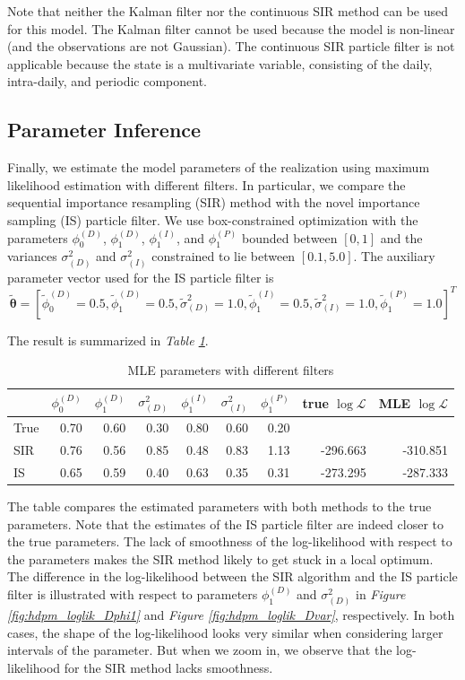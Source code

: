 \documentclass[11pt, oneside]{scrreprt}   	%
\begin{document}
Note that neither the Kalman filter nor the continuous SIR method can be used for this model. The Kalman filter cannot be used because the model is non-linear (and the observations are not Gaussian). The continuous SIR particle filter is not applicable because the state is a multivariate variable, consisting of the daily, intra-daily, and periodic component.\\

\subsection{Parameter Inference}
Finally, we estimate the model parameters of the realization using maximum likelihood estimation with different filters. In particular, we compare the sequential importance resampling (SIR) method with the novel importance sampling (IS) particle filter. We use box-constrained optimization with the parameters $\phi_0^{(D)}$,  $\phi_1^{(D)}$, $\phi_1^{(I)}$, and $\phi_1^{(P)}$ bounded between $[0,1]$ and the variances $\sigma^2_{(D)}$ and $\sigma^2_{(I)}$ constrained to lie between $[0.1, 5.0]$. The auxiliary parameter vector used for the IS particle filter is 
$$
\boldsymbol{\tilde{\theta}} = [ \tilde{\phi}_0^{(D)} = 0.5,  \tilde{\phi}_1^{(D)} = 0.5, \tilde{\sigma}^2_{(D)} = 1.0, \tilde{\phi}_1^{(I)} = 0.5, \tilde{\sigma}^2_{(I)} = 1.0, \tilde{\phi}_1^{(P)} = 1.0]^T
$$


The result is summarized in \textit{Table \ref{tab:hdpm_param_inference}}.\\  

\begin{table}[h!]
\centering
\begin{tabular}{l r r r r r r r r}
\hline
& $\phi_0^{(D)}$ &  $\phi_1^{(D)}$ & $\sigma^2_{(D)}$ & $\phi_1^{(I)}$ & $\sigma^2_{(I)}$ & $\phi_1^{(P)}$ & true $\log \mathcal{L} $ & MLE $\log \mathcal{L} $ \\
\hline
True        & 0.70  & 0.60 &  0.30 & 0.80 & 0.60 & 0.20&  &  \\
SIR         & 0.76  & 0.56  & 0.85 & 0.48 & 0.83 & 1.13 & -296.663 & -310.851 \\
IS            & 0.65  & 0.59  & 0.40 & 0.63 & 0.35 & 0.31 & -273.295 & -287.333\\
\hline
\end{tabular}
\caption{MLE parameters with different filters}
\label{tab:hdpm_param_inference}
\end{table}
The table compares the estimated parameters with both methods to the true parameters. Note that the estimates of the IS particle filter are indeed closer to the true parameters. The lack of smoothness of the log-likelihood with respect to the parameters makes the SIR method likely to get stuck in a local optimum. The difference in the log-likelihood between the SIR algorithm and the IS particle filter is illustrated with respect to parameters $\phi_1^{(D)}$ and $\sigma_{(D)}^2$ in \textit{Figure \ref{fig:hdpm_loglik_Dphi1}} and \textit{Figure \ref{fig:hdpm_loglik_Dvar}}, respectively. In both cases, the shape of the log-likelihood looks very similar when considering larger intervals of the parameter. But when we zoom in, we observe that the log-likelihood for the SIR method lacks smoothness. 
\end{document}
